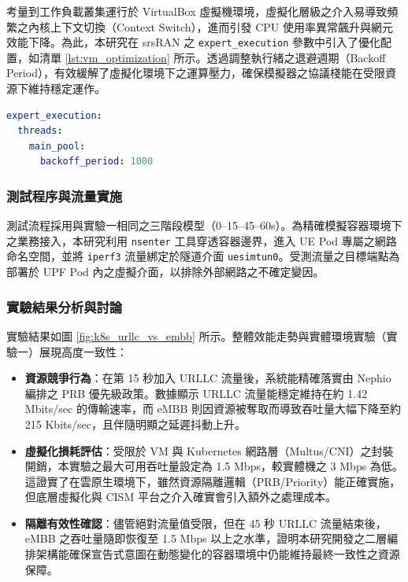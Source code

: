 考量到工作負載叢集運行於 VirtualBox 虛擬機環境，虛擬化層級之介入易導致頻繁之內核上下文切換（Context Switch），進而引發 CPU 使用率異常飆升與網元效能下降。為此，本研究在 srsRAN 之 \texttt{expert\_execution} 參數中引入了優化配置，如清單 \ref{lst:vm_optimization} 所示。透過調整執行緒之退避週期（Backoff Period），有效緩解了虛擬化環境下之運算壓力，確保模擬器之協議棧能在受限資源下維持穩定運作。

\begin{lstlisting}[language=yaml, caption={針對虛擬化環境之 srsRAN 執行緒優化配置}, label={lst:vm_optimization}]
expert_execution:
  threads:
    main_pool:
      backoff_period: 1000
\end{lstlisting}

\subsubsection{測試程序與流量實施}
測試流程採用與實驗一相同之三階段模型（0--15--45--60s）。為精確模擬容器環境下之業務接入，本研究利用 \texttt{nsenter} 工具穿透容器邊界，進入 UE Pod 專屬之網路命名空間，並將 \texttt{iperf3} 流量綁定於隧道介面 \texttt{uesimtun0}。受測流量之目標端點為部署於 UPF Pod 內之虛擬介面，以排除外部網路之不確定變因。

\subsubsection{實驗結果分析與討論}
實驗結果如圖 \ref{fig:k8s_urllc_vs_embb} 所示。整體效能走勢與實體環境實驗（實驗一）展現高度一致性：
\begin{itemize}
    \item \textbf{資源競爭行為}：在第 15 秒加入 URLLC 流量後，系統能精確落實由 Nephio 編排之 PRB 優先級政策。數據顯示 URLLC 流量能穩定維持在約 1.42 Mbits/sec 的傳輸速率，而 eMBB 則因資源被奪取而導致吞吐量大幅下降至約 215 Kbits/sec，且伴隨明顯之延遲抖動上升。
    \item \textbf{虛擬化損耗評估}：受限於 VM 與 Kubernetes 網路層（Multus/CNI）之封裝開銷，本實驗之最大可用吞吐量設定為 1.5 Mbps，較實體機之 3 Mbps 為低。這證實了在雲原生環境下，雖然資源隔離邏輯（PRB/Priority）能正確實施，但底層虛擬化與 CISM 平台之介入確實會引入額外之處理成本。
    \item \textbf{隔離有效性確認}：儘管絕對流量值受限，但在 45 秒 URLLC 流量結束後，eMBB 之吞吐量隨即恢復至 1.5 Mbps 以上之水準，證明本研究開發之二層編排架構能確保宣告式意圖在動態變化的容器環境中仍能維持最終一致性之資源保障。
\end{itemize}

